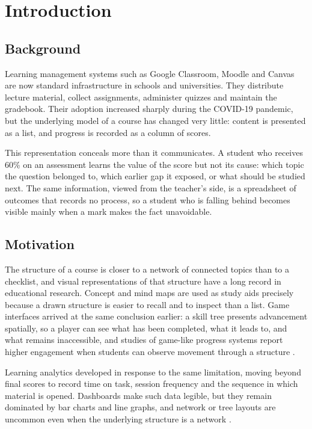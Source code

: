 \chapter{Introduction}

\section{Background}

Learning management systems such as Google Classroom, Moodle and Canvas are now standard infrastructure in schools and universities. They distribute lecture material, collect assignments, administer quizzes and maintain the gradebook. Their adoption increased sharply during the COVID-19 pandemic, but the underlying model of a course has changed very little: content is presented as a list, and progress is recorded as a column of scores.

This representation conceals more than it communicates. A student who receives 60\% on an assessment learns the value of the score but not its cause: which topic the question belonged to, which earlier gap it exposed, or what should be studied next. The same information, viewed from the teacher's side, is a spreadsheet of outcomes that records no process, so a student who is falling behind becomes visible mainly when a mark makes the fact unavoidable.

\section{Motivation}

The structure of a course is closer to a network of connected topics than to a checklist, and visual representations of that structure have a long record in educational research. Concept and mind maps are used as study aids precisely because a drawn structure is easier to recall and to inspect than a list. Game interfaces arrived at the same conclusion earlier: a skill tree presents advancement spatially, so a player can see what has been completed, what it leads to, and what remains inaccessible, and studies of game-like progress systems report higher engagement when students can observe movement through a structure \cite{deterding2011game}.

Learning analytics developed in response to the same limitation, moving beyond final scores to record time on task, session frequency and the sequence in which material is opened. Dashboards make such data legible, but they remain dominated by bar charts and line graphs, and network or tree layouts are uncommon even when the underlying structure is a network \cite{schwendimann2017perceiving}.

